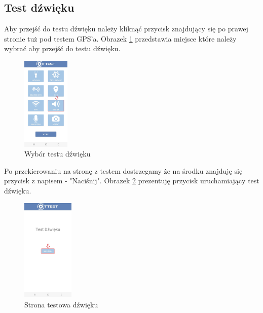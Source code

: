 \newpage


\subsection{Test dźwięku}

Aby przejść do testu dźwięku należy kliknąć przycisk znajdujący się po prawej stronie tuż pod testem GPS'a.
\newline
Obrazek \ref{rys:menu5} przedstawia miejsce które należy wybrać aby przejść do testu dźwięku.

\begin{figure}[!hbt]
	\begin{center}
		\includegraphics[angle=360, width=0.20\textwidth]{rys/punkt6/menu5}
		\caption{Wybór testu dźwięku}
		\label{rys:menu5}
	\end{center}
\end{figure}

Po przekierowaniu na stronę z testem dostrzegamy że na środku znajduję się przycisk z napisem - "Naciśnij".
\newline
Obrazek \ref{rys:dźwięk} prezentuję przycisk uruchamiający test dźwięku.

\begin{figure}[!hbt]
	\begin{center}
		\includegraphics[angle=360, width=0.22\textwidth]{rys/punkt6/dźwięk}
		\caption{Strona testowa dźwięku}
		\label{rys:dźwięk}
	\end{center}
\end{figure}

